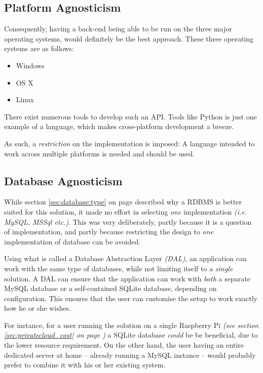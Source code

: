 		\subsection{Platform Agnosticism}
			\label{sec:restrict:platform}
			Consequently, having a back-end being able to be run on the three major operating systems, would definitely be the best approach. These three operating systems are as follows:
			\begin{itemize}
				\item Windows
				\item OS X
				\item Linux
			\end{itemize}

			There exist numerous tools to develop such an API. Tools like Python is just one example of a language, which makes cross-platform development a breeze.

			As such, a \emph{restriction} on the implementation is imposed: A language intended to work across multiple platforms is needed and should be used.

		\subsection{Database Agnosticism}
			\label{sec:restrict:database}
			While section \ref{sec:database:type} on page \pageref{sec:database:type} described why a RDBMS is better suited for this solution, it made no effort in selecting \emph{one} implementation \emph{(i.e. MySQL, MSSql etc.)}. This was very deliberately, partly because it is a question of implementation, and partly because restricting the design to \emph{one} implementation of database can be avoided.

			Using what is called a Database Abstraction Layer \emph{(DAL)}, an application can work with the same type of databases, while not limiting itself to a \emph{single} solution. A DAL can ensure that the application can work with \emph{both} a separate MySQL database or a self-contained SQLite database, depending on configuration. This ensures that the user can customise the setup to work exactly how he or she wishes. 

			For instance, for a user running the solution on a single Raspberry Pi \emph{(see section \ref{sec:privatecloud_cost} on page \pageref{sec:privatecloud_cost})} a SQLite database \emph{could} be be beneficial, due to the lower resource requirement. On the other hand, the user having an entire dedicated server at home -- already running a MySQL instance -- would probably prefer to combine it with his or her existing system.


